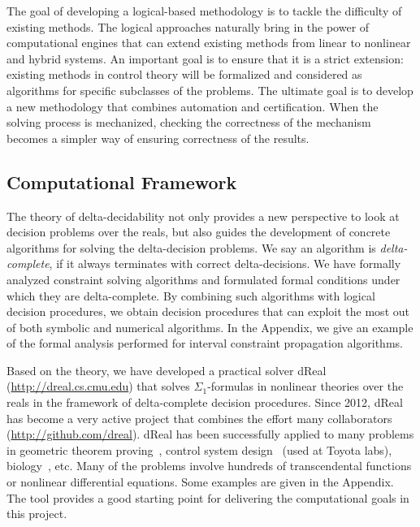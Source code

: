 \documentclass[10pt]{article}
\theoremstyle{definition}
\begin{document}
The goal of developing a logical-based methodology is to tackle the difficulty of existing methods. The logical approaches naturally bring in the power of computational engines that can extend existing methods from linear to nonlinear and hybrid systems. An important goal is to ensure that it is a strict extension: existing methods in control theory will be formalized and considered as algorithms for specific subclasses of the problems. The ultimate goal is to develop a new methodology that combines automation and certification. When the solving process is mechanized, checking the correctness of the mechanism becomes a simpler way of ensuring correctness of the results. 

\subsection{Computational Framework}\label{dreal}

The theory of delta-decidability not only provides a new perspective to look at decision problems over the reals, but also guides the development of concrete algorithms for solving the delta-decision problems. We say an algorithm is {\em delta-complete}, if it always terminates with correct delta-decisions. We have formally analyzed constraint solving algorithms and formulated formal conditions under which they are delta-complete. By combining such algorithms with logical decision procedures, we obtain decision procedures that can exploit the most out of both symbolic and numerical algorithms. In the Appendix, we give an example of the formal analysis performed for interval constraint propagation algorithms. 

Based on the theory, we have developed a practical solver dReal~\cite{DBLP:conf/cade/GaoKC13,DBLP:conf/fmcad/GaoKC13} (\url{http://dreal.cs.cmu.edu}) that solves $\Sigma_1$-formulas in nonlinear theories over the reals in the framework of delta-complete decision procedures. Since 2012, dReal has become a very active project that combines the effort many collaborators (\url{http://github.com/dreal}). dReal has been successfully applied to many problems in geometric theorem proving~\cite{DBLP:conf/cade/GaoKC13}, control system design~\cite{DBLP:conf/fmcad/GaoKC13,DBLP:conf/hybrid/KapinskiDSA14} (used at Toyota labs), biology~\cite{DBLP:conf/fmcad/GaoKC13}, etc. Many of the problems involve hundreds of transcendental functions or nonlinear differential equations. Some examples are given in the Appendix. The tool provides a good starting point for delivering the computational goals in this project.
\end{document}
